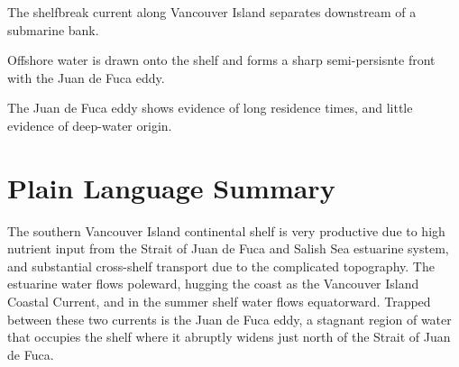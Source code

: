 \documentclass[draft]{agujournal2019}
\begin{document}

\begin{keypoints}
\item The shelfbreak current along Vancouver Island separates downstream of a submarine bank.
\item Offshore water is drawn onto the shelf and forms a sharp semi-persisnte front with the Juan de Fuca eddy.
\item The Juan de Fuca eddy shows evidence of long residence times, and little evidence of deep-water origin.
\end{keypoints}

%
%

%
%


\begin{abstract}

\end{abstract}

\section*{Plain Language Summary}

The southern Vancouver Island continental shelf is very productive due to high nutrient input from the Strait of Juan de Fuca and Salish Sea estuarine system, and substantial cross-shelf transport due to the complicated topography.  The estuarine water flows poleward, hugging the coast as the Vancouver Island Coastal Current, and in the summer shelf water flows equatorward.  Trapped between these two currents is the Juan de Fuca eddy, a stagnant region of water that occupies the shelf where it abruptly widens just north of the Strait of Juan de Fuca.
\end{document}
